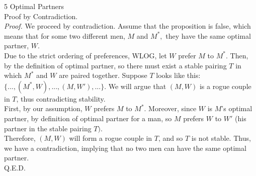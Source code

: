 \documentclass{article}
\begin{document}
{\Large 5 Optimal Partners} \\[.5cm]
Proof by Contradiction.\\[.5cm]
\textit{Proof.} We proceed by contradiction. Assume that the proposition is false, which means that for some two different men, $M$ and $M^*,$ they have the same optimal partner, $W$.\\[.3cm]
Due to the strict ordering of preferences, WLOG, let $W$ prefer $M$ to $M^*.$ Then, by the definition of optimal partner, so there must exist a stable pairing $T$ in which $M^*$ and $W$ are paired together. Suppose $T$ looks like this: $\{..., (M^*, W), ..., (M, W'), ...\}.$ We will argue that $(M, W)$ is a rogue couple in $T$, thus contradicting stability.\\[.3cm]
First, by our assumption, $W$ prefers $M$ to $M^*$. Moreover, since $W$ is $M$'s optimal partner, by definition of optimal partner for a man, so $M$ prefers $W$ to $W'$ (his partner in the stable pairing $T).$\\[.3cm]
Therefore, $(M, W)$ will form a rogue couple in $T$, and so $T$ is not stable. Thus, we have a contradiction, implying that no two men can have the same optimal partner.\\[.5cm]
Q.E.D.
\end{document}
